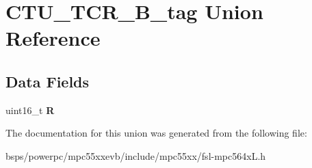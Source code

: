 \hypertarget{unionCTU__TCR__16B__tag}{}\section{C\+T\+U\+\_\+\+T\+C\+R\+\_\+B\+\_\+tag Union Reference}
\label{unionCTU__TCR__16B__tag}
\subsection*{Data Fields}
\begin{DoxyCompactItemize}
\item 
\mbox{\label{unionCTU__TCR__16B__tag_af48fc1cb4653d7faf39d0caa655c56c6}} 
uint16\+\_\+t {\bfseries R}
\end{DoxyCompactItemize}


The documentation for this union was generated from the following file\+:\begin{DoxyCompactItemize}
\item 
bsps/powerpc/mpc55xxevb/include/mpc55xx/fsl-\/mpc564x\+L.\+h\end{DoxyCompactItemize}
